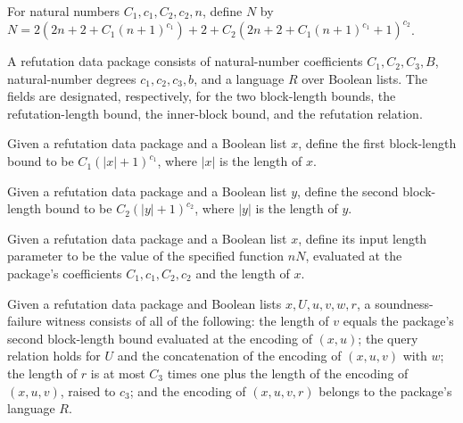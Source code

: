 \begin{definition}
\label{Complexity.Yap.nN}
\leanok
For natural numbers $C_1,c_1,C_2,c_2,n$, define $N$ by
$N=2(2n+2+C_1(n+1)^{c_1})+2+C_2(2n+2+C_1(n+1)^{c_1}+1)^{c_2}$.
\end{definition}

\begin{definition}
\label{Complexity.Yap.Data}
\leanok
A refutation data package consists of natural-number coefficients $C_1,C_2,C_3,B$,
natural-number degrees $c_1,c_2,c_3,b$, and a language $R$ over Boolean lists. The
fields are designated, respectively, for the two block-length bounds, the
refutation-length bound, the inner-block bound, and the refutation relation.
\end{definition}

\begin{definition}
\leanok
Given a refutation data package and a Boolean list $x$, define the first block-length
bound to be $C_1(|x|+1)^{c_1}$, where $|x|$ is the length of $x$.
\end{definition}

\begin{definition}
\leanok
Given a refutation data package and a Boolean list $y$, define the second block-length
bound to be $C_2(|y|+1)^{c_2}$, where $|y|$ is the length of $y$.
\end{definition}

\begin{definition}
\label{Complexity.Yap.Data.nLen}
\leanok
{}
Given a refutation data package and a Boolean list $x$, define its input length
parameter to be the value of the specified function $nN$, evaluated at the package's
coefficients $C_1,c_1,C_2,c_2$ and the length of $x$.
\end{definition}

\begin{definition}
\label{Complexity.Yap.Data.SoundFail}
\leanok
{}
Given a refutation data package and Boolean lists $x,U,u,v,w,r$, a soundness-failure
witness consists of all of the following: the length of $v$ equals the package's second
block-length bound evaluated at the encoding of $(x,u)$; the query relation holds for
$U$ and the concatenation of the encoding of $(x,u,v)$ with $w$; the length of $r$ is at
most $C_3$ times one plus the length of the encoding of $(x,u,v)$, raised to $c_3$; and
the encoding of $(x,u,v,r)$ belongs to the package's language $R$.
\end{definition}

